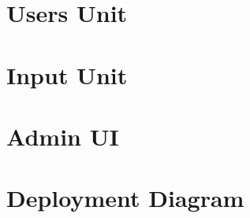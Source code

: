 \documentclass[]{article}
\begin{document}
    \section{Users Unit}
    
    \newpage
    
    \section{Input Unit}
    
    \newpage
    
    \section{Admin UI}
    
    \newpage
    
    \section{Deployment Diagram}
        
    \newpage
\end{document}
